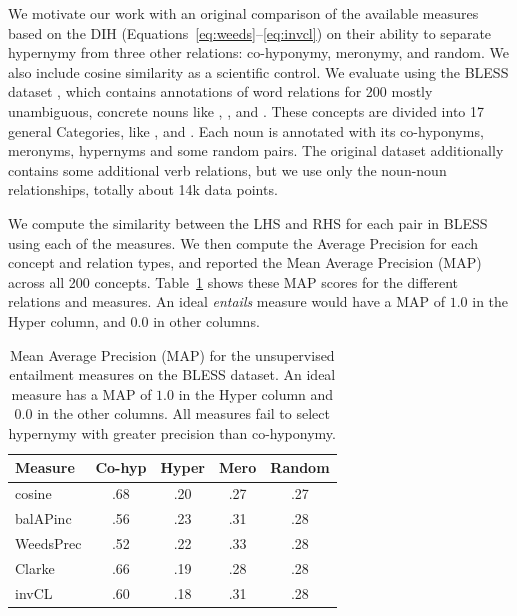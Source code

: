 We motivate our work with an original comparison of the available measures
based on the DIH (Equations~\ref{eq:weeds}--\ref{eq:invcl}) on their ability to
separate hypernymy from three other relations: co-hyponymy, meronymy, and
random. We also include cosine similarity as a scientific control.
We evaluate using the BLESS dataset \cite{baroni:2011:gems},
which contains annotations of word relations for 200 mostly unambiguous, concrete
nouns like , , and . These concepts are divided
into 17 general Categories, like ,  and
. Each noun is annotated with its co-hyponyms, meronyms,
hypernyms and some random pairs. The original dataset additionally contains
some additional verb relations, but we use only the noun-noun relationships,
totally about 14k data points.

We compute the similarity between the LHS and RHS for each pair in BLESS using
each of the measures.  We then compute the Average Precision for each concept
and relation types, and reported the Mean Average Precision (MAP) across all
200 concepts.  Table~\ref{tab:mapscores1} shows these MAP scores for the
different relations and measures. An ideal {\em entails} measure would have a
MAP of $1.0$ in the Hyper column, and $0.0$ in other columns.

\begin{table}
  \centering
  \begin{small}
  \begin{tabular}{|l|cccc|}
    \hline
    Measure        & Co-hyp  & Hyper  & Mero  & Random  \\
    \hline
    cosine         &   .68   &   .20  &  .27  &    .27  \\
    balAPinc       &   .56   &   .23  &  .31  &    .28  \\
    WeedsPrec      &   .52   &   .22  &  .33  &    .28  \\
    Clarke         &   .66   &   .19  &  .28  &    .28  \\
    invCL          &   .60   &   .18  &  .31  &    .28  \\
    \hline
  \end{tabular}
  \end{small}
  \caption{Mean Average Precision (MAP)  for the unsupervised entailment
    measures on the BLESS dataset. An ideal measure has a MAP of $1.0$ in the
    Hyper column and $0.0$ in the other columns. All measures fail to select
    hypernymy with greater precision than co-hyponymy.}
  \label{tab:mapscores1}
\end{table}

